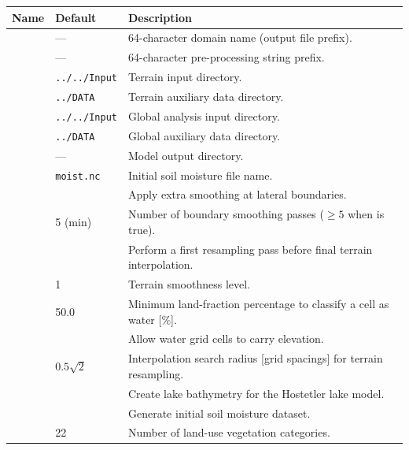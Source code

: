 \begin{longtable}{L{4cm} L{3cm} L{7cm}}
  \toprule
  \textbf{Name} & \textbf{Default} & \textbf{Description} \\
  \midrule
  \endhead
  \bottomrule
  \endfoot
      & ---          & 64-character domain name (output file prefix). \\
       & ---          & 64-character pre-processing string prefix. \\
       & \texttt{../../Input} & Terrain input directory. \\
       & \texttt{../DATA}     & Terrain auxiliary data directory. \\
      & \texttt{../../Input} & Global analysis input directory. \\
      & \texttt{../DATA}     & Global auxiliary data directory. \\
       & ---          & Model output directory. \\
   & \texttt{moist.nc} & Initial soil moisture file name. \\
      &  & Apply extra smoothing at lateral boundaries. \\
     & 5 (min)      & Number of boundary smoothing passes ($\geq5$
    when  is true). \\
      &  & Perform a first resampling pass before
    final terrain interpolation. \\
     & 1 & Terrain smoothness level. \\
       & 50.0 & Minimum land-fraction percentage to classify a cell
    as water [$\%$]. \\
       &  & Allow water grid cells to carry elevation. \\
       & $0.5\sqrt{2}$ & Interpolation search radius [grid spacings]
    for terrain resampling. \\
     &  & Create lake bathymetry for the Hostetler
    lake model. \\
      &  & Generate initial soil moisture dataset. \\
         & 22 & Number of land-use vegetation categories. \\
\end{longtable}

